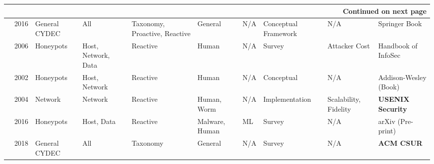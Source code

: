 \begin{landscape}
\begin{longtable}{|p{0.6cm}|p{0.8cm}|p{2.6cm}|p{2.2cm}|p{2.8cm}|p{2.5cm}|p{2cm}|p{2.5cm}|p{2.8cm}|p{3.8cm}|}
            \hline \multicolumn{10}{|r|}{{Continued on next page}}                                                                                                                                                                                                                                                                          \\ \hline
            \endfoot

            \hline \hline
            \endlastfoot

            \cite{rowe2016introduction}   & 2016          & General CYDEC            & All                 & Taxonomy, Proactive, Reactive & General                     & N/A                     & Conceptual Framework       & N/A                                                              & Springer Book                          \\ \hline
            \cite{cohen2006use}           & 2006          & Honeypots                & Host, Network, Data & Reactive                      & Human                       & N/A                     & Survey                     & Attacker Cost                                                    & Handbook of InfoSec                    \\ \hline
            \cite{spitzner2002honeypots}  & 2002          & Honeypots                & Host, Network       & Reactive                      & Human                       & N/A                     & Conceptual                 & N/A                                                              & Addison-Wesley (Book)                  \\ \hline
            \cite{provos2004virtual}      & 2004          & Network                  & Network             & Reactive                      & Human, Worm                 & N/A                     & Implementation             & Scalability, Fidelity                                            & \textbf{USENIX Security}               \\ \hline
            \cite{nawrocki2016survey}     & 2016          & Honeypots                & Host, Data          & Reactive                      & Malware, Human              & ML                      & Survey                     & N/A                                                              & arXiv (Pre-print)                      \\ \hline
            \cite{han2018deception}       & 2018          & General CYDEC            & All                 & Taxonomy                      & General                     & N/A                     & Survey                     & N/A                                                              & \textbf{ACM CSUR}                      \\ \hline

\end{longtable}
\end{landscape}
